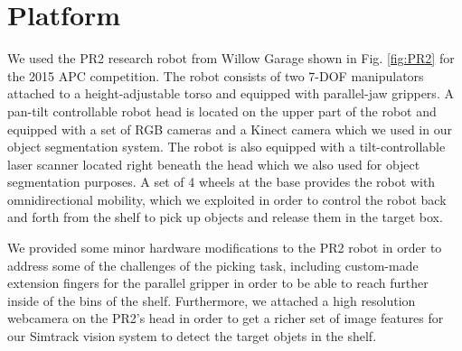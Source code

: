 \section{Platform}
\label{sec:platform}

We used the PR2 research robot from Willow Garage shown in Fig.
\ref{fig:PR2} for the 2015 APC competition. The robot consists of two
7-DOF manipulators attached to a height-adjustable torso and equipped with parallel-jaw
grippers. A pan-tilt controllable robot head is located on the upper part of the robot
and equipped with a set of RGB cameras and a Kinect camera which we used in
our object segmentation system. The robot is also
equipped with a tilt-controllable laser scanner located right beneath the head which we
also used for object segmentation purposes.
A set of 4 wheels at the base provides the robot with omnidirectional mobility, which we
exploited in order to control the robot back and forth from the shelf to pick up objects
and release them in the target box.

We provided some minor hardware modifications to the PR2 robot in order to
address some of the challenges  of the picking task,
including custom-made extension fingers for the parallel gripper in order
to be able to reach further inside of the bins of the shelf. Furthermore,
we attached a high resolution webcamera on the PR2's head in order to get
a richer set of image features for our Simtrack vision system to detect the target 
objets in the shelf.

